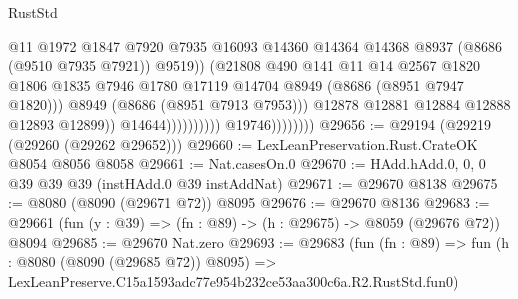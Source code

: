 \begin{lexlean}{RustStd}
\begin{coremodule}
                                                  @11
                                                  @1972
                                                  @1847
                                                  @7920
                                                  @7935
                                                  @16093
                                                  @14360
                                                  @14364
                                                  @14368
                                                  @8937
                                                  (@8686 (@9510 @7935 @7921))
                                                  @9519))
                                              (@21808
                                                @490
                                                @141
                                                @11
                                                @14
                                                @2567
                                                @1820
                                                @1806
                                                @1835
                                                @7946
                                                @1780
                                                @17119
                                                @14704
                                                @8949
                                                (@8686 (@8951 @7947 @1820)))
                                              @8949
                                              (@8686 (@8951 @7913 @7953)))
                                            @12878
                                            @12881
                                            @12884
                                            @12888
                                            @12893
                                            @12899))
                                        @14644))))))))))
                    @19746))))))))
@29656 := @29194 (@29219 (@29260 (@29262 @29652)))
@29660 := LexLeanPreservation.Rust.CrateOK @8054 @8056 @8058
@29661 := Nat.casesOn.{0}
@29670 := HAdd.hAdd.{0, 0, 0} @39 @39 @39 (instHAdd.{0} @39 instAddNat)
@29671 := @29670 @8138
@29675 := @8080 (@8090 (@29671 @72)) @8095
@29676 := @29670 @8136
@29683 := @29661 (fun (y : @39) => (fn : @89) -> (h : @29675) -> @8059 (@29676 @72)) @8094
@29685 := @29670 Nat.zero
@29693 := @29683
    (fun (fn : @89) =>
    fun (h : @8080 (@8090 (@29685 @72)) @8095) =>
    LexLeanPreserve.C15a1593adc77e954b232ce53aa300c6a.R2.RustStd.fun0)

\end{coremodule}
\end{lexlean}
